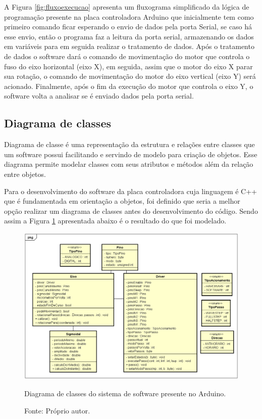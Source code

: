 A Figura \ref{fig:fluxoexecucao} apresenta um fluxograma simplificado da lógica de programação presente 
na placa controladora Arduino que inicialmente tem como primeiro comando ficar esperando o envio de 
dados pela porta Serial, se caso há esse envio, então o programa faz a leitura da porta serial, 
armazenando os dados em variáveis para em seguida realizar o tratamento de dados. Após o tratamento 
de dados o software dará o comando de movimentação do motor que controla o fuso do eixo horizontal 
(eixo X), em seguida, assim que o motor do eixo X parar sua rotação, o comando de movimentação 
do motor do eixo vertical (eixo Y) será acionado. Finalmente, após o fim da execução do motor 
que controla o eixo Y, o software volta a analisar se é enviado dados pela porta serial.

\subsection{Diagrama de classes}\label{subsec:metdiagrama}

Diagrama de classe é uma representação da estrutura e relações entre classes que um software possui 
facilitando e servindo de modelo para criação de objetos. Esse diagrama permite modelar classes com seus 
atributos e métodos além da relação entre objetos.

Para o desenvolvimento do software da placa controladora cuja linguagem é C++ que é fundamentada em 
orientação a objetos, foi definido que seria a melhor opção realizar um diagrama de classes antes do 
desenvolvimento do código. Sendo assim a Figura \ref{fig:diagramaclasses} apresentada abaixo é 
o resultado do que foi modelado.

\begin{landscape}
\begin{figure}[!htb]
\centering
\includegraphics[scale = 0.73]{figuras/diagramaclasses}
\caption{Diagrama de classes do sistema de software presente no Arduino.}
\caption*{Fonte: Próprio autor.}
\label{fig:diagramaclasses}
\end{figure}
\end{landscape}

